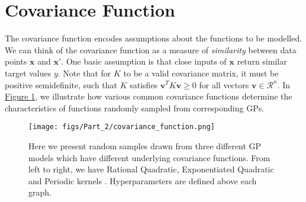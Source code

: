 \section{Covariance Function}{\label{subsection:covariance_function}}

The covariance function encodes assumptions about the functions to be modelled. We can think of the covariance function as a measure of \textit{similarity} between data points $\boldsymbol{x}$ and $\boldsymbol{x'}$. One basic assumption is that close inputs of $\boldsymbol{x}$ return similar target values $y$. Note that for $K$ to be a valid covariance matrix, it must be positive semidefinite, such that $K$ satisfies $\boldsymbol{v}^T K \boldsymbol{v} \geq 0$ for all vectors $\boldsymbol{v} \in \mathcal{R}^n$. In \hyperref[fig:kernels]{Figure \ref*{fig:kernels}}, we illustrate how various common covariance functions determine the characteristics of functions randomly sampled from corresponding GPs. 

\begin{figure}[H]
    \centering
    \texttt{[image: figs/Part\_2/covariance\_function.png]}
    \caption{Here we present random samples drawn from three different GP models which have different underlying covariance functions. From left to right, we have Rational Quadratic, Exponentiated Quadratic and Periodic kernels \cite{roelants_2019_gaussian}. Hyperparameters are defined above each graph.}
    \label{fig:kernels}
\end{figure}


